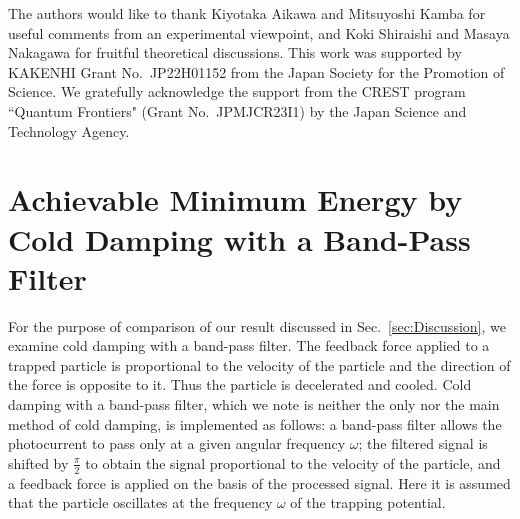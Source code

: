 \documentclass[aps,pra,superscriptaddress,twocolumn
]{revtex4-2}
\begin{document}
 
 
 
 \begin{acknowledgements}
 The authors would like to thank Kiyotaka Aikawa and Mitsuyoshi Kamba 
 for useful comments from an experimental viewpoint, 
 and Koki Shiraishi and Masaya Nakagawa for fruitful theoretical discussions.
 This work was supported by KAKENHI Grant No.~JP22H01152 from the Japan Society for the Promotion of Science. 
 We gratefully acknowledge the support from the CREST program ``Quantum Frontiers" 
 (Grant No.~JPMJCR23I1) by the Japan Science and Technology Agency.
 \end{acknowledgements}
 
 
 
 
 
 
 
 
 
 
 
 
 
 
 
 
 
 
 \appendix
 
 
 \section{Achievable Minimum Energy by Cold Damping with a Band-Pass Filter}\label{sec:CD}
 
 
 For the purpose of comparison of our result discussed in Sec.~\ref{sec:Discussion}, 
 we examine cold damping with a band-pass filter.
 The feedback force applied to a trapped particle is 
  proportional to the velocity of the particle 
 and the direction of the force is opposite to it. 
 Thus the particle is decelerated and cooled.
 {Cold damping with a band-pass filter, 
 which we note is neither the only nor the main method of cold damping, 
 is implemented as follows:}
 a band-pass filter allows the photocurrent 
 to pass only at a given angular frequency $\omega$; 
 the filtered signal is shifted by $\frac{\pi}{2}$ 
 to obtain the signal proportional to the velocity of the particle, 
 and a feedback force is applied on the basis of the processed signal. 
 Here it is assumed that the particle oscillates at the frequency $\omega$ of the trapping potential.
 
 
 
\end{document}
